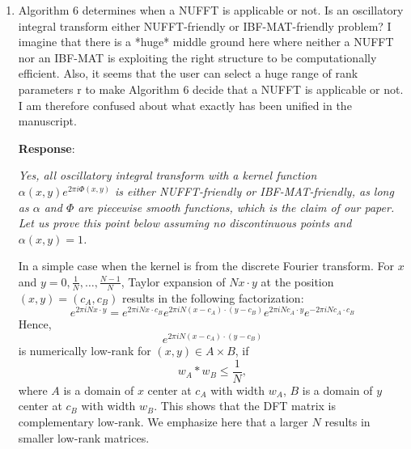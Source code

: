 \documentclass[11pt]{article}
\newcommand{\Response}{{\bf Response}}
\begin{document}
\begin{enumerate}
\Response: {\it  Thanks for the comments. We have rewritten Section 2.2 according to your suggestions. 1) We have changed the order of Algorithm 3 and 4. A vector recovery problem is descibed to motivate Algorithm 4 (now it is Algorithm 3 in the revision). 2) You are right that it is more appropriate to us TV3 norm minimization to summarize Algorithm 3 and 4, because we try to minimize the difference of third order derivatives. 3) We have updated the variable ``c" in Line 20 of Algorithm 3. 4) It might not be important to understand how the proposed algorithms solves (12) since we don't require an exact solution. Any solution that are piecewise smooth such that the low-rank recovery algorithm works is good enough. 5) $\tau$ is not an important parameter, since we don't require exact identification of discontinuous points. We have tested different $\tau$ in a wide range, as long as $\tau$ is not close to $0$, which will result in too many fake discontinuous points that fail the scaling of the proposed algorithm, the matrix recovery algorithm will work. We have commented this in the end of Page 8.}

\item Algorithm 6 determines when a NUFFT is applicable or not. Is an oscillatory integral transform either NUFFT-friendly or IBF-MAT-friendly problem?  I imagine that there is a *huge* middle ground here where neither a NUFFT nor an IBF-MAT is exploiting the right structure to be computationally efficient. Also, it seems that the user can select a huge range of rank parameters r to make Algorithm 6 decide that a NUFFT is applicable or not. I am therefore confused about what exactly has been unified in the manuscript.  


\Response: {\it  Yes, all oscillatory integral transform with a kernel function $\alpha(x,y)e^{2\pi i\Phi(x,y)}$ is either NUFFT-friendly or IBF-MAT-friendly, as long as $\alpha$ and $\Phi$ are piecewise smooth functions, which is the claim of our paper. Let us prove this point below assuming no discontinuous points and $\alpha(x,y)=1$.

In a simple case when the kernel is from the discrete Fourier transform. For $x$ and $y=0,\frac{1}{N},\dots,\frac{N-1}{N}$, Taylor expansion of $Nx\cdot y$ at the position $(x,y)=(c_A,c_B)$ results  in the following factorization:
\begin{equation*}
e^{2\pi iN x \cdot y}=e^{2\pi i N x \cdot c_B}e^{2\pi i N(x-c_A)\cdot(y-c_B)}e^{2\pi iN c_A\cdot y}e^{-2\pi i N c_A\cdot c_B}
\end{equation*}
Hence,
\[ 
e^{2\pi iN (x-c_A)\cdot(y -c_B)}
\]
is numerically low-rank for $(x,y)\in A\times B$, if 
\[
w_A*w_B\leq \frac{1}{N},
\]
where $A$ is a domain of $x$ center at $c_A$ with width $w_A$, $B$ is a domain of $y$ center at $c_B$ with width $w_B$. This shows that the DFT matrix is complementary low-rank. We emphasize here that a  larger $N$ results in smaller low-rank matrices.

}
\end{enumerate}
\end{document}
